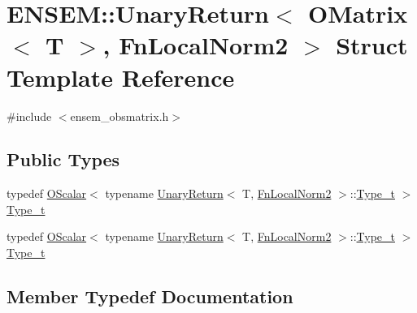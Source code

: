 \hypertarget{structENSEM_1_1UnaryReturn_3_01OMatrix_3_01T_01_4_00_01FnLocalNorm2_01_4}{}\section{E\+N\+S\+EM\+:\+:Unary\+Return$<$ O\+Matrix$<$ T $>$, Fn\+Local\+Norm2 $>$ Struct Template Reference}
\label{structENSEM_1_1UnaryReturn_3_01OMatrix_3_01T_01_4_00_01FnLocalNorm2_01_4}


{\ttfamily \#include $<$ensem\+\_\+obsmatrix.\+h$>$}

\subsection*{Public Types}
\begin{DoxyCompactItemize}
\item 
typedef \mbox{\hyperlink{classENSEM_1_1OScalar}{O\+Scalar}}$<$ typename \mbox{\hyperlink{structENSEM_1_1UnaryReturn}{Unary\+Return}}$<$ T, \mbox{\hyperlink{structENSEM_1_1FnLocalNorm2}{Fn\+Local\+Norm2}} $>$\+::\mbox{\hyperlink{structENSEM_1_1UnaryReturn_3_01OMatrix_3_01T_01_4_00_01FnLocalNorm2_01_4_a9961e369c46fba05c0388f2ac5bef1ca}{Type\+\_\+t}} $>$ \mbox{\hyperlink{structENSEM_1_1UnaryReturn_3_01OMatrix_3_01T_01_4_00_01FnLocalNorm2_01_4_a9961e369c46fba05c0388f2ac5bef1ca}{Type\+\_\+t}}
\item 
typedef \mbox{\hyperlink{classENSEM_1_1OScalar}{O\+Scalar}}$<$ typename \mbox{\hyperlink{structENSEM_1_1UnaryReturn}{Unary\+Return}}$<$ T, \mbox{\hyperlink{structENSEM_1_1FnLocalNorm2}{Fn\+Local\+Norm2}} $>$\+::\mbox{\hyperlink{structENSEM_1_1UnaryReturn_3_01OMatrix_3_01T_01_4_00_01FnLocalNorm2_01_4_a9961e369c46fba05c0388f2ac5bef1ca}{Type\+\_\+t}} $>$ \mbox{\hyperlink{structENSEM_1_1UnaryReturn_3_01OMatrix_3_01T_01_4_00_01FnLocalNorm2_01_4_a9961e369c46fba05c0388f2ac5bef1ca}{Type\+\_\+t}}
\end{DoxyCompactItemize}


\subsection{Member Typedef Documentation}
\mbox{\label{structENSEM_1_1UnaryReturn_3_01OMatrix_3_01T_01_4_00_01FnLocalNorm2_01_4_a9961e369c46fba05c0388f2ac5bef1ca}} 
